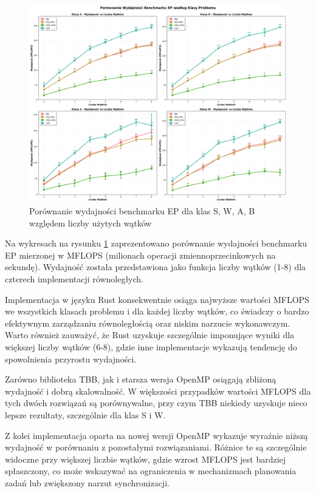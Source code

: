 \begin{figure}[H]
    \centering
    \includegraphics[width=\textwidth]{analiza/images/parallel/ep/arm/ep_porownanie_wydajnosci.png}
    \caption{Porównanie wydajności benchmarku EP dla klas S, W, A, B względem liczby użytych wątków}
    \label{ep_porownanie_wydajnosci}
\end{figure}
Na wykresach na rysunku \ref{ep_porownanie_wydajnosci} zaprezentowano porównanie wydajności benchmarku EP mierzonej w MFLOPS (milionach operacji zmiennoprzecinkowych na sekundę). Wydajność została przedstawiona jako funkcja liczby wątków (1-8) dla czterech implementacji równoległych.

Implementacja w języku Rust konsekwentnie osiąga najwyższe wartości MFLOPS we wszystkich klasach problemu i dla każdej liczby wątków, co świadczy o bardzo efektywnym zarządzaniu równoległością oraz niskim narzucie wykonawczym. Warto również zauważyć, że Rust uzyskuje szczególnie imponujące wyniki dla większej liczby wątków (6-8), gdzie inne implementacje wykazują tendencję do spowolnienia przyrostu wydajności.

Zarówno biblioteka TBB, jak i starsza wersja OpenMP osiągają zbliżoną wydajność i dobrą skalowalność. W większości przypadków wartości MFLOPS dla tych dwóch rozwiązań są porównywalne, przy czym TBB niekiedy uzyskuje nieco lepsze rezultaty, szczególnie dla klas S i W.

Z kolei implementacja oparta na nowej wersji OpenMP wykazuje wyraźnie niższą wydajność w porównaniu z pozostałymi rozwiązaniami. Różnice te są szczególnie widoczne przy większej liczbie wątków, gdzie wzrost MFLOPS jest bardziej spłaszczony, co może wskazywać na ograniczenia w mechanizmach planowania zadań lub zwiększony narzut synchronizacji.


